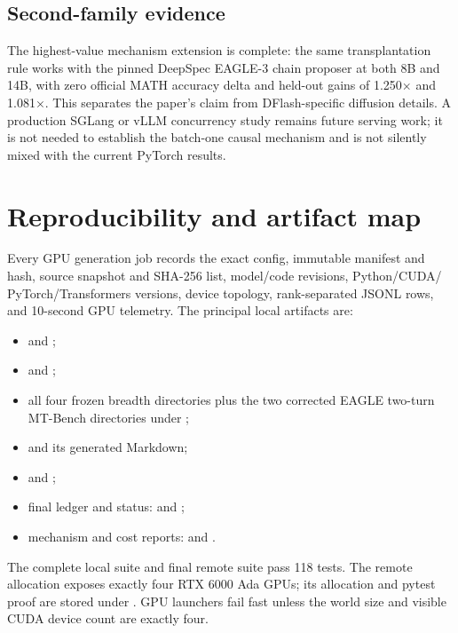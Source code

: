 \documentclass[10pt]{article}
\begin{document}
\subsection{Second-family evidence}

The highest-value mechanism extension is complete: the same transplantation
rule works with the pinned DeepSpec EAGLE-3 chain proposer at both 8B and 14B,
with zero official MATH accuracy delta and held-out gains of 1.250$\times$ and
1.081$\times$. This separates the paper's claim from DFlash-specific diffusion
details. A production SGLang or vLLM concurrency study remains future serving
work; it is not needed to establish the batch-one causal mechanism and is not
silently mixed with the current PyTorch results.

\section{Reproducibility and artifact map}

Every GPU generation job records the exact config, immutable manifest and
hash, source snapshot and SHA-256 list, model/code revisions, Python/CUDA/
PyTorch/Transformers versions, device topology, rank-separated JSONL rows, and
10-second GPU telemetry. The principal local artifacts are:

\begin{itemize}
  \item {} and
        ;
  \item {} and
        ;
  \item all four frozen breadth directories plus the two corrected EAGLE
        two-turn MT-Bench directories under ;
  \item {} and its generated Markdown;
  \item {} and
        ;
  \item final ledger and status:  and
        ;
  \item mechanism and cost reports:  and
        .
\end{itemize}

The complete local suite and final remote suite pass 118 tests. The remote
allocation exposes exactly four RTX 6000 Ada GPUs; its allocation
and pytest proof are stored under
. GPU launchers fail fast unless
the world size and visible CUDA device count are exactly four.
\end{document}
